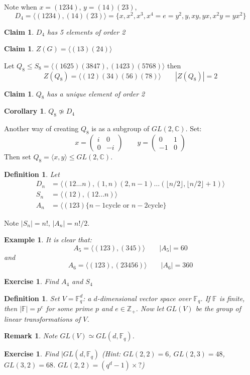 \documentclass[a4paper,10pt]{article}
\newcommand{\CC}{\mathbb{C}}
\newcommand{\ZZ}{\mathbb{Z}}
\newcommand{\FF}{\mathbb{F}}
\newtheorem{Def}[thm]{Definition}
\newtheorem{Cor}[thm]{Corollary}
\newtheorem{cl}[thm]{Claim}
\newtheorem{eg}[thm]{Example}
\newtheorem{Ex}[thm]{Exercise}
\newtheorem{rem}[thm]{Remark}
\begin{document}
Note when $x = (1234)$, $y = (14)(23)$,
\[ D_4 = \langle (1234), (14)(23)\rangle = \{ x, x^2, x^3, x^4 = e = y^2, y, xy, yx, x^2y = yx^2 \} \]
\begin{cl}
$D_4$ has 5 elements of order 2
\end{cl}
\begin{cl}
$Z(G) = \langle (13)(24) \rangle$
\end{cl}
Let $Q_8 \leq S_8 = \langle (1625)(3847),(1423)(5768)\rangle$ then
\[ Z(Q_8) = \langle (12)(34)(56)(78)\rangle \qquad |Z(Q_8)| = 2 \]
\begin{cl}
$Q_8$ has a unique element of order 2
\end{cl}
\begin{Cor}
$Q_8 \not\simeq D_4$
\end{Cor}
Another way of creating $Q_8$ is as a subgroup of $GL(2,\CC)$. Set:
\[ x = \begin{pmatrix}
 i & 0 \\ 0 & -i
 \end{pmatrix} \qquad y = \begin{pmatrix}
 0 & 1 \\ -1 & 0
 \end{pmatrix} \]
Then set $Q_8 = \langle x,y\rangle \leq GL(2,\CC)$.
\begin{Def}
Let
\begin{align*}
D_n &= \langle (12\dots n),(1,n)(2,n-1)\dots(\lfloor n / 2 \rfloor, \lfloor n / 2 \rfloor +1) \rangle \\
S_n  &= \langle (12),(12\dots n) \rangle \\
A_n &= \langle (123) \{ n-1 \text{cycle or } n-2 \text{cycle} \}
\end{align*}
\end{Def}
Note $|S_n| = n!$, $|A_n| = n! / 2$.
\begin{eg}
It is clear that:
\[A_5= \langle (123),(345) \rangle \qquad |A_5| = 60 \]
and 
\[A_6 = \langle (123), (23456) \rangle \qquad |A_6| = 360 \]
\end{eg}
\begin{Ex}
Find $A_4$ and $S_4$
\end{Ex}
\begin{Def}
Set $V = \FF_q^d$: a $d$-dimensional vector space over $\FF_q$. If $\FF$ is finite, then $|\FF| = p^e$ for some prime $p$ and $e \in \ZZ_+$. Now let $GL(V)$ be the group of linear transformations of $V$. 
\end{Def}
\begin{rem}
Note $GL(V) \simeq GL(d, \FF_q)$.
\end{rem}
\begin{Ex}
Find $|GL(d,\FF_q)$ (\textit{Hint: $GL(2,2) = 6$, $GL(2,3) = 48$, $GL(3,2) = 68$. $GL(2,2) = (q^d - 1) \times ?$})
\end{Ex}
\end{document}
